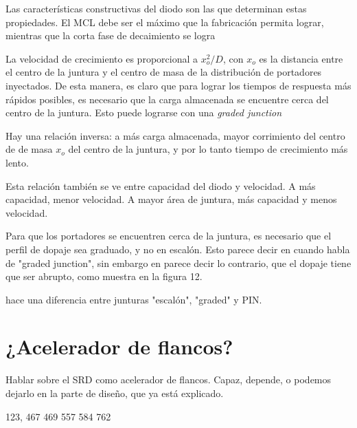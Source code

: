 Las características constructivas del diodo son las que determinan estas
propiedades. El MCL debe ser el máximo que la fabricación permita lograr,
mientras que la corta fase de decaimiento se logra 

La velocidad de crecimiento es  proporcional a $x_o^2/D$, con $x_o$ es la
distancia entre el centro de la juntura y el centro de masa de la distribución
de portadores inyectados. De esta manera, es claro que para lograr los tiempos
de respuesta más rápidos posibles, es necesario que la carga almacenada se
encuentre cerca del centro de la juntura. Esto puede lograrse con una
\textit{graded junction}

Hay una relación inversa: a más carga almacenada, mayor corrimiento del centro
de de masa $x_o$ del centro de la juntura, y por lo tanto tiempo de crecimiento
más lento.

Esta relación también se ve entre capacidad del diodo y velocidad. A más
capacidad, menor velocidad. A mayor área de juntura, más capacidad y menos
velocidad.

Para que los portadores se encuentren cerca de la juntura, es necesario que el
perfil de dopaje sea graduado, y no en escalón. Esto parece decir en
\cite{moll1962} cuando habla de "graded junction", sin embargo en
\cite{moll1969} parece decir lo contrario, que el dopaje tiene que ser abrupto,
como muestra en la figura 12.

\cite{moll1962} hace una diferencia entre junturas "escalón", "graded" y PIN.

\section{¿Acelerador de flancos?}

Hablar sobre el SRD como acelerador de flancos. Capaz, depende, o podemos
dejarlo en la parte de diseño, que ya está explicado.

123, 467 469 557 584 762
